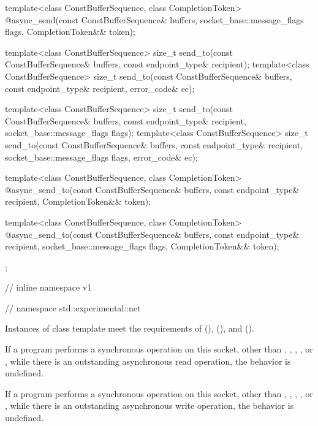 \begin{codeblock}
{{{    template<class ConstBufferSequence, class CompletionToken>
      @\DEDUCED@ async_send(const ConstBufferSequence& buffers,
                         socket_base::message_flags flags,
                         CompletionToken&& token);

    template<class ConstBufferSequence>
      size_t send_to(const ConstBufferSequence& buffers,
                     const endpoint_type& recipient);
    template<class ConstBufferSequence>
      size_t send_to(const ConstBufferSequence& buffers,
                     const endpoint_type& recipient, error_code& ec);

    template<class ConstBufferSequence>
      size_t send_to(const ConstBufferSequence& buffers,
                     const endpoint_type& recipient,
                     socket_base::message_flags flags);
    template<class ConstBufferSequence>
      size_t send_to(const ConstBufferSequence& buffers,
                     const endpoint_type& recipient,
                     socket_base::message_flags flags, error_code& ec);

    template<class ConstBufferSequence, class CompletionToken>
      @\DEDUCED@ async_send_to(const ConstBufferSequence& buffers,
                            const endpoint_type& recipient,
                            CompletionToken&& token);

    template<class ConstBufferSequence, class CompletionToken>
      @\DEDUCED@ async_send_to(const ConstBufferSequence& buffers,
                            const endpoint_type& recipient,
                            socket_base::message_flags flags,
                            CompletionToken&& token);
  };

} // inline namespace v1
} // namespace std::experimental::net
\end{codeblock}

\pnum
Instances of class template  meet the requirements of  (),  (), and  ().

\pnum
If a program performs a synchronous operation on this socket, other than , , , , or , while there is an outstanding asynchronous read operation, the behavior is undefined.

\pnum
If a program performs a synchronous operation on this socket, other than , , , , or , while there is an outstanding asynchronous write operation, the behavior is undefined.

